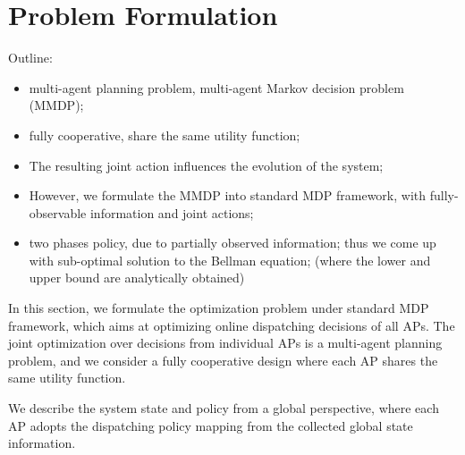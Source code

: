 \section{Problem Formulation}
Outline:
\begin{itemize}
    \item multi-agent planning problem, multi-agent Markov decision problem (MMDP);
    \item fully cooperative, share the same utility function;
    \item The resulting joint action influences the evolution of the system;
    \item However, we formulate the MMDP into standard MDP framework, with fully-observable information and joint actions;
    \item two phases policy, due to partially observed information; thus we come up with sub-optimal solution to the Bellman equation; (where the lower and upper bound are analytically obtained)
\end{itemize}

In this section, we formulate the optimization problem under standard MDP framework, which aims at optimizing online dispatching decisions of all APs.
The joint optimization over decisions from individual APs is a multi-agent planning problem, and we consider a fully cooperative design where each AP shares the same utility function.

We describe the system state and policy from a global perspective, where each AP adopts the dispatching policy mapping from the collected global state information.


